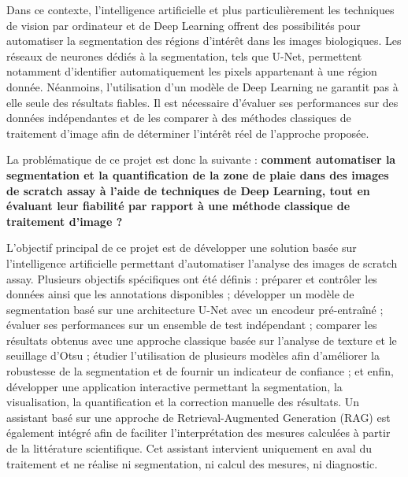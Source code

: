 \documentclass[12pt,a4paper]{report}
\begin{document}
\vspace{0.3cm}
\noindent
\hspace{1cm}Dans ce contexte, l'intelligence artificielle et plus particulièrement les techniques de vision par ordinateur et de Deep Learning offrent des possibilités pour automatiser la segmentation des régions d'intérêt dans les images biologiques. Les réseaux de neurones dédiés à la segmentation, tels que U-Net, permettent notamment d'identifier automatiquement les pixels appartenant à une région donnée. Néanmoins, l'utilisation d'un modèle de Deep Learning ne garantit pas à elle seule des résultats fiables. Il est nécessaire d'évaluer ses performances sur des données indépendantes et de les comparer à des méthodes classiques de traitement d'image afin de déterminer l'intérêt réel de l'approche proposée.

\vspace{0.3cm}
\noindent
La problématique de ce projet est donc la suivante : \textbf{comment automatiser la segmentation et la quantification de la zone de plaie dans des images de scratch assay à l'aide de techniques de Deep Learning, tout en évaluant leur fiabilité par rapport à une méthode classique de traitement d'image ?}

\vspace{0.3cm}
\noindent
\hspace{1cm}L'objectif principal de ce projet est de développer une solution basée sur l'intelligence artificielle permettant d'automatiser l'analyse des images de scratch assay. Plusieurs objectifs spécifiques ont été définis : préparer et contrôler les données ainsi que les annotations disponibles ; développer un modèle de segmentation basé sur une architecture U-Net avec un encodeur pré-entraîné ; évaluer ses performances sur un ensemble de test indépendant ; comparer les résultats obtenus avec une approche classique basée sur l'analyse de texture et le seuillage d'Otsu ; étudier l'utilisation de plusieurs modèles afin d'améliorer la robustesse de la segmentation et de fournir un indicateur de confiance ; et enfin, développer une application interactive permettant la segmentation, la visualisation, la quantification et la correction manuelle des résultats. Un assistant basé sur une approche de Retrieval-Augmented Generation (RAG) est également intégré afin de faciliter l'interprétation des mesures calculées à partir de la littérature scientifique. Cet assistant intervient uniquement en aval du traitement et ne réalise ni segmentation, ni calcul des mesures, ni diagnostic.
\end{document}
